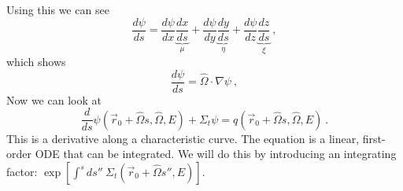 \documentclass[12pt]{article}
\newcommand{\rvec}{\ensuremath{\vec{r}}}
\newcommand{\vOmega}{\ensuremath{\hat{\Omega}}}
\begin{document}
Using this we can see
\[\frac{d\psi}{ds} = \frac{d\psi}{dx}\underbrace{\frac{dx}{ds}}_{\mu} + \frac{d\psi}{dy}\underbrace{\frac{dy}{ds}}_{\eta} + \frac{d\psi}{dz}\underbrace{\frac{dz}{ds}}_{\xi}\:,\]
which shows 
\[\frac{d\psi}{ds} = \vOmega \cdot \nabla \psi\:,\]
Now we can look at
\[\frac{d}{ds}\psi(\rvec_0 + \vOmega s, \vOmega, E) + \Sigma_t \psi = q(\rvec_0 + \vOmega s, \vOmega, E)\:.\]
This is a derivative along a characteristic curve. 
The equation is a linear, first-order ODE that can be integrated. 
We will do this by introducing an integrating factor: $\exp[\int^s ds'' \: \Sigma_t(\rvec_0 + \vOmega s'', E)]$. 
\end{document}
